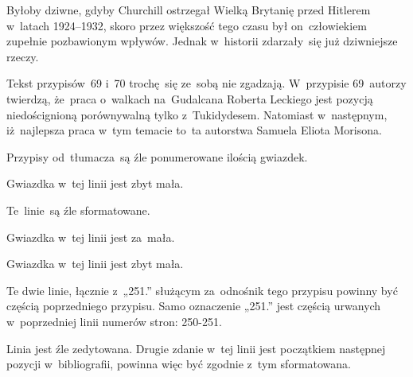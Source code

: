 \documentclass[a4paper,11pt]{article}
\begin{document}
\noindent
{} Byłoby dziwne, gdyby Churchill ostrzegał Wielką Brytanię przed
Hitlerem w~latach 1924--1932, skoro przez większość tego czasu był
on~człowiekiem zupełnie pozbawionym wpływów. Jednak w~historii zdarzały~się
już dziwniejsze rzeczy.

\VerSpaceFour





\noindent
{} Tekst przypisów~69 i~70 trochę~się ze~sobą nie zgadzają.
W~przypisie 69~autorzy twierdzą, że~praca o~walkach na~Gudalcana Roberta
Leckiego jest pozycją niedoścignioną porównywalną tylko z~Tukidydesem.
Natomiast w~następnym, iż~najlepsza praca w~tym temacie to~ta autorstwa
Samuela Eliota Morisona.

\VerSpaceFour





\noindent
{} Przypisy od~tłumacza~są źle ponumerowane ilością gwiazdek.

\VerSpaceFour





\noindent
{} Gwiazdka w~tej linii jest zbyt mała.

\VerSpaceFour





\noindent
{} Te~linie~są źle sformatowane.

\VerSpaceFour





\noindent
{} Gwiazdka w~tej linii jest za~mała.

\VerSpaceFour





\noindent
{} Gwiazdka w~tej linii jest zbyt mała.

\VerSpaceFour





\noindent
{} Te dwie linie, łącznie z~„251.” służącym za~odnośnik
tego przypisu powinny być częścią poprzedniego przypisu. Samo oznaczenie
„251.” jest częścią urwanych w~poprzedniej linii numerów stron: 250-251.

\VerSpaceFour





\noindent
{} Linia jest źle zedytowana. Drugie zdanie w~tej linii
jest początkiem następnej pozycji w~bibliografii, powinna więc być zgodnie
z~tym sformatowana.
\end{document}
